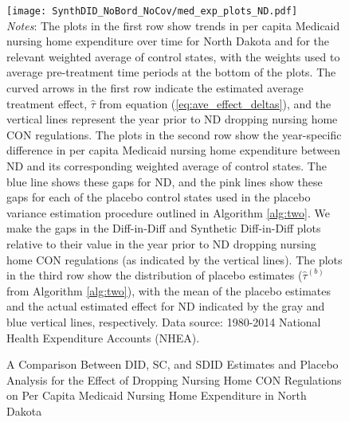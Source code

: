 \documentclass[../Main.tex]{subfiles}
\begin{document}
\newpage
{}
\begin{figure}[t] 
    \setlength{}
	\caption{\label{fig:med_exp_plots_nd} \centering A Comparison Between DID, SC, and SDID Estimates and Placebo Analysis for the Effect of Dropping Nursing Home CON Regulations on Per Capita Medicaid Nursing Home Expenditure in North Dakota} {\centering\texttt{[image: SynthDID\_NoBord\_NoCov/med\_exp\_plots\_ND.pdf]}}
    \vspace{-1.4cm}\\
    \scriptsize
		\textit{Notes}: The plots in the first row show trends in per capita Medicaid nursing home expenditure over time for North Dakota and for the relevant weighted average of control states, with the weights used to average pre-treatment time periods at the bottom of the plots. The curved arrows in the first row indicate the estimated average treatment effect, $\hat{\tau}$ from equation (\ref{eq:ave_effect_deltas}), and the vertical lines represent the year prior to ND dropping nursing home CON regulations. The plots in the second row show the year-specific difference in per capita Medicaid nursing home expenditure between ND and its corresponding weighted average of control states. The blue line shows these gaps for ND, and the pink lines show these gaps for each of the placebo control states used in the placebo variance estimation procedure outlined in Algorithm \ref{alg:two}. We make the gaps in the Diff-in-Diff and Synthetic Diff-in-Diff plots relative to their value in the year prior to ND dropping nursing home CON regulations (as indicated by the vertical lines). The plots in the third row show the distribution of placebo estimates ($\hat{\tau}^{(b)}$ from Algorithm \ref{alg:two}), with the mean of the placebo estimates and the actual estimated effect for ND indicated by the gray and blue vertical lines, respectively. Data source: 1980-2014 National Health Expenditure Accounts (NHEA).
\end{figure}
\restoregeometry
\clearpage
\end{document}
